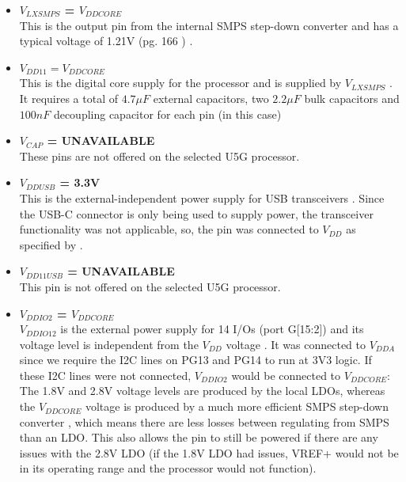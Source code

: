 \begin{itemize}
        \item \textbf{$V_{LXSMPS}$ = $V_{DDCORE}$} \\
        This is the output pin from the internal SMPS step-down converter and has a typical voltage of 1.21V (pg. 166 \cite{u5-datasheet}) \cite{u5-getting-started}.

        \item \textbf{$V_{DD11} = V_{DDCORE}$} \\
        This is the digital core supply for the processor and is supplied by $V_{LXSMPS}$ \cite{u5-getting-started}. It requires a total of $4.7\mu F$ external capacitors, two $2.2\mu F$ bulk capacitors and $100nF$ decoupling capacitor for each pin (in this case) \cite{u5-datasheet} \cite{u5-getting-started}

        \item \textbf{$V_{CAP}$ = UNAVAILABLE} \\
        These pins are not offered on the selected U5G processor.

        \item \textbf{$V_{DDUSB}$ = 3.3V} \\
        This is the external-independent power supply for USB transceivers \cite{u5-getting-started}. Since the USB-C connector is only being used to supply power, the transceiver functionality was not applicable, so, the pin was connected to $V_{DD}$ as specified by \cite{u5-getting-started}.

        \item \textbf{$V_{DD11USB}$ = UNAVAILABLE} \\
        This pin is not offered on the selected U5G processor.

        \item \textbf{$V_{DDIO2}$ = $V_{DDCORE}$} \\
        $V_{DDIO12}$ is the external power supply for 14 I/Os (port G[15:2]) and its voltage level is independent from the $V_{DD}$ voltage \cite{u5-getting-started}. It was connected to $V_{DDA}$ since we require the I2C lines on PG13 and PG14 to run at 3V3 logic. If these I2C lines were not connected, $V_{DDIO2}$ would be connected to $V_{DDCORE}$:
        The 1.8V and 2.8V voltage levels are produced by the local LDOs, whereas the $V_{DDCORE}$ voltage is produced by a much more efficient SMPS step-down converter \cite{stm-power}, which means there are less losses between regulating from SMPS than an LDO. This also allows the pin to still be powered if there are any issues with the 2.8V LDO (if the 1.8V LDO had issues, VREF+ would not be in its operating range and the processor would not function).


\end{itemize}
